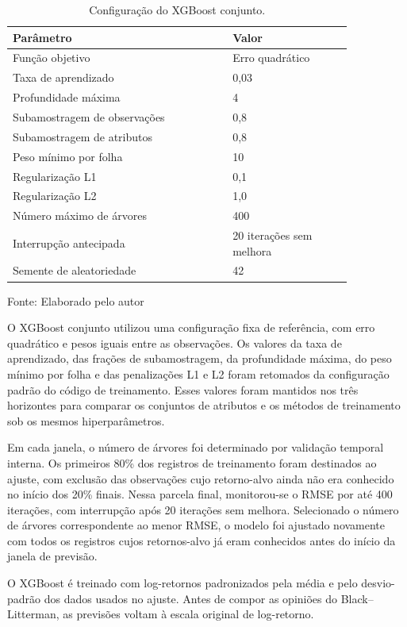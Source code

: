 \begin{table}[H]
\centering
\caption{Configuração do XGBoost conjunto.}
\label{tab:parametros_xgb}
{\footnotesize
\renewcommand{\arraystretch}{0.9}
\begin{tabular}{p{0.55\linewidth}p{0.30\linewidth}}
\hline
Parâmetro & Valor \\ \hline
Função objetivo & Erro quadrático \\
Taxa de aprendizado & 0,03 \\
Profundidade máxima & 4 \\
Subamostragem de observações & 0,8 \\
Subamostragem de atributos & 0,8 \\
Peso mínimo por folha & 10 \\
Regularização L1 & 0,1 \\
Regularização L2 & 1,0 \\
Número máximo de árvores & 400 \\
Interrupção antecipada & 20 iterações sem melhora \\
Semente de aleatoriedade & 42 \\
\hline
\end{tabular}}
\par
Fonte: Elaborado pelo autor
\end{table}

O XGBoost conjunto utilizou uma configuração fixa de
referência, com erro quadrático e pesos iguais entre
as observações. Os valores da taxa de aprendizado, das
frações de subamostragem, da profundidade máxima, do
peso mínimo por folha e das penalizações L1 e L2 foram
retomados da configuração padrão do código de treinamento.
Esses valores foram mantidos nos três horizontes para
comparar os conjuntos de atributos e os métodos de
treinamento sob os mesmos hiperparâmetros.

Em cada janela, o número de árvores foi determinado
por validação temporal interna. Os primeiros 80\% dos
registros de treinamento foram destinados ao ajuste,
com exclusão das observações cujo retorno-alvo ainda
não era conhecido no início dos 20\% finais. Nessa
parcela final, monitorou-se o RMSE por até 400 iterações,
com interrupção após 20 iterações sem melhora.
Selecionado o número de árvores correspondente ao menor
RMSE, o modelo foi ajustado novamente com todos os
registros cujos retornos-alvo já eram conhecidos antes
do início da janela de previsão.

O XGBoost é treinado com log-retornos padronizados pela
média e pelo desvio-padrão dos dados usados no ajuste.
Antes de compor as opiniões do Black--Litterman, as
previsões voltam à escala original de log-retorno.

